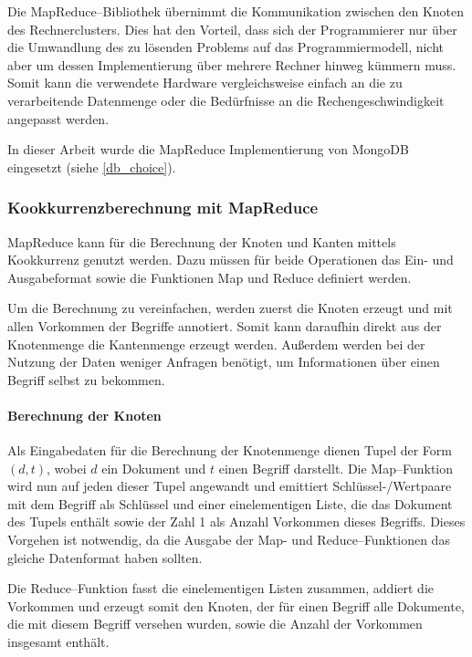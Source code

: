 Die MapReduce--Bibliothek übernimmt die Kommunikation zwischen den Knoten des Rechnerclusters. Dies hat den Vorteil, dass sich der Programmierer nur über die Umwandlung des zu lösenden Problems auf das Programmiermodell, nicht aber um dessen Implementierung über mehrere Rechner hinweg kümmern muss. Somit kann die verwendete Hardware vergleichsweise einfach an die zu verarbeitende Datenmenge oder die Bedürfnisse an die Rechengeschwindigkeit angepasst werden.

In dieser Arbeit wurde die MapReduce Implementierung von MongoDB eingesetzt (siehe \cref{db_choice}).

\subsubsection{Kookkurrenzberechnung mit MapReduce}
\label{mapreduce_cooccurence}

MapReduce kann für die Berechnung der Knoten und Kanten mittels Kookkurrenz genutzt werden. Dazu müssen für beide Operationen das Ein- und Ausgabeformat sowie die Funktionen Map und Reduce definiert werden.

Um die Berechnung zu vereinfachen, werden zuerst die Knoten erzeugt und mit allen Vorkommen der Begriffe annotiert. Somit kann daraufhin direkt aus der Knotenmenge die Kantenmenge erzeugt werden. Außerdem werden bei der Nutzung der Daten weniger Anfragen benötigt, um Informationen über einen Begriff selbst zu bekommen.

\paragraph{Berechnung der Knoten}

Als Eingabedaten für die Berechnung der Knotenmenge dienen Tupel der Form \((d, t)\), wobei \(d\) ein Dokument und \(t\) einen Begriff darstellt. Die Map--Funktion wird nun auf jeden dieser Tupel angewandt und emittiert Schlüssel-/Wertpaare mit dem Begriff als Schlüssel und einer einelementigen Liste, die das Dokument des Tupels enthält sowie der Zahl \num{1} als Anzahl Vorkommen dieses Begriffs. Dieses Vorgehen ist notwendig, da die Ausgabe der Map- und Reduce--Funktionen das gleiche Datenformat haben sollten.

Die Reduce--Funktion fasst die einelementigen Listen zusammen, addiert die Vorkommen und erzeugt somit den Knoten, der für einen Begriff alle Dokumente, die mit diesem Begriff versehen wurden, sowie die Anzahl der Vorkommen insgesamt enthält.

